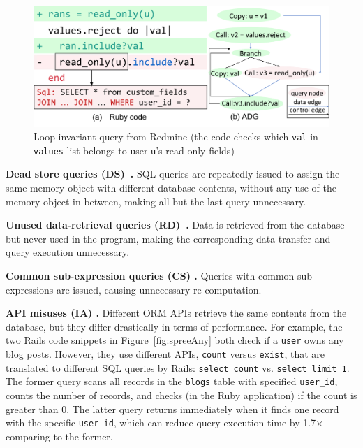 \begin{figure}
\centering
\includegraphics[width=0.8\columnwidth]{figs/redCom.pdf}

  \caption{Loop invariant query from Redmine \textmd{(the code checks which {\tt val} in {\tt values} 
  list belongs to user {\tt u}'s read-only fields})
  }
\label{fig:loopinv}
\end{figure}



\textbf{Dead store queries (DS)~\cite{junwen:icse2018}.} SQL queries are repeatedly issued to assign the same
memory object with different database contents, without any use of the memory object in between, making all but the last query unnecessary.

\textbf{Unused data-retrieval queries (RD)~\cite{chen2016finding, junwen:icse2018}.} 
Data is retrieved from the database but never 
used in the program, making the corresponding data transfer and query execution unnecessary. 

\textbf{Common sub-expression queries (CS) \cite{yan:cikm17}.} Queries with common sub-expressions are issued, causing 
unnecessary re-computation.

\textbf{API misuses (IA) \cite{junwen:icse2018}.} Different ORM APIs retrieve the same contents from the database, but they differ drastically in terms of performance.
For example, the two Rails code snippets in Figure~\ref{fig:spreeAny} both check if a {\tt user} owns
any blog posts. However, they use different APIs, {\tt count} versus {\tt exist}, that are translated to different
SQL queries by Rails: {\tt select count} vs. {\tt select limit 1}.
The former query scans all records in the {\tt blogs} table with specified {\tt user\_id}, counts the number of records, and checks (in the Ruby application) if the count is greater than 0.
The latter query
returns immediately when it finds one record with the specific {\tt user\_id}, 
which can reduce query execution time by 1.7$\times$ comparing to the former.


